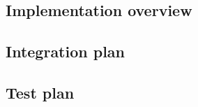 \subsection{Implementation overview}
\label{sec:implementation_plan}



\newpage
\subsection{Integration plan}
\label{sec:integration_plan}



\newpage
\subsection{Test plan}
\label{sec:test_plan}


